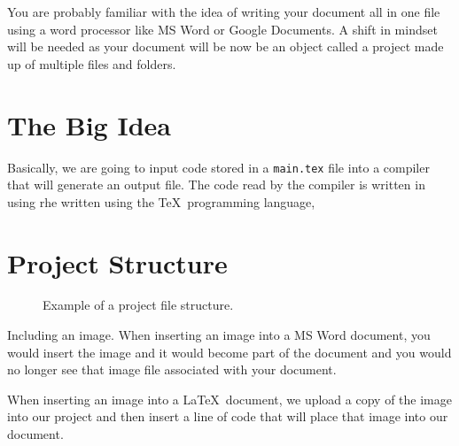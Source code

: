 You are probably familiar with the idea of writing your document all in one 
file using a word processor like MS Word or Google Documents. A shift in mindset
will be needed as your document will be now be an object called a project made 
up of multiple files and folders. 

\section{The Big Idea}

Basically, we are going to input code stored in a \texttt{main.tex} file into
a compiler that will generate an output file.  The code read by the compiler is 
written in using rhe written using the \TeX\ 
programming language, 

\section{Project Structure}
\begin{figure}[ht]

\caption{Example of a project file structure.}
\end{figure}


\begin{example}{Including an image.}
  When inserting an image into a MS Word document, you would insert the image 
  and it would become part of the document and you would no longer see that
  image file associated with your document.  
  
  When inserting an image into a \LaTeX ~document, we upload a copy of the 
  image into our project and then insert a line of code that will place that
  image into our document.
\end{example}

